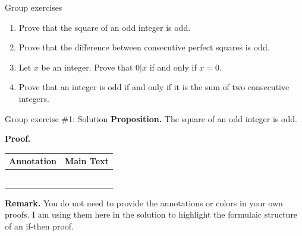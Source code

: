 \documentclass[10pt]{beamer}
\begin{document}
\begin{frame}{Group exercises}
\begin{enumerate}
	\item Prove that the square of an odd integer is odd.
	\item Prove that the difference between consecutive perfect squares is odd.
	\item Let $x$ be an integer.  Prove that $0|x$ if and only if $x=0$.
	\item Prove that an integer is odd if and only if it is the sum of two consecutive integers.
\end{enumerate}
	
\end{frame}


\begin{frame}{Group exercise \#1: Solution}
\textbf{Proposition.} The square of an odd integer is odd.

\textbf{Proof.}

\begin{tabularx}{\textwidth}{|L{3cm}|X|}
\hline \textbf{Annotation} & \textbf{Main Text} \\ \hline
  &   \\ \hline
{} &  \\ \hline
{} &  \\ \hline
{} &    \\ \hline
  &  \\ \hline
   &  \\ \hline
\hline
\end{tabularx}
\pause 
\vfill 
\footnotesize 
\textbf{Remark.}  You do not need to provide the annotations or colors in your own proofs. I am using them here in the solution to highlight the formulaic structure of an if-then proof.
\end{frame}
\end{document}
